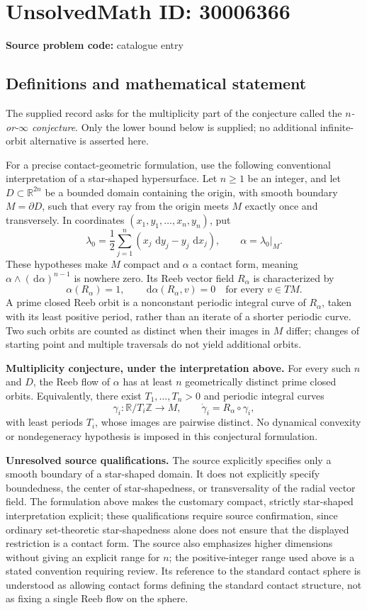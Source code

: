 \documentclass[11pt]{article}
\newcommand{\Z}{\mathbb{Z}}
\newcommand{\R}{\mathbb{R}}
\newcommand{\dd}{\,\mathrm{d}}
\begin{document}
\section*{UnsolvedMath ID: 30006366}
\textbf{Source problem code:} catalogue entry
\subsection{Definitions and mathematical statement}
The supplied record asks for the multiplicity part of the conjecture called the \emph{\(n\)-or-\(\infty\) conjecture}. Only the lower bound below is supplied; no additional infinite-orbit alternative is asserted here.

For a precise contact-geometric formulation, use the following conventional interpretation of a star-shaped hypersurface. Let \(n\geq 1\) be an integer, and let \(D\subset\R^{2n}\) be a bounded domain containing the origin, with smooth boundary \(M=\partial D\), such that every ray from the origin meets \(M\) exactly once and transversely. In coordinates \((x_1,y_1,\ldots,x_n,y_n)\), put
\[
\lambda_0=\frac12\sum_{j=1}^{n}(x_j\,\dd y_j-y_j\,\dd x_j),\qquad \alpha=\lambda_0|_M.
\]
These hypotheses make \(M\) compact and \(\alpha\) a contact form, meaning \(\alpha\wedge(\dd\alpha)^{n-1}\) is nowhere zero. Its Reeb vector field \(R_\alpha\) is characterized by
\[
\alpha(R_\alpha)=1,\qquad \dd\alpha(R_\alpha,v)=0\quad\text{for every }v\in TM.
\]
A prime closed Reeb orbit is a nonconstant periodic integral curve of \(R_\alpha\), taken with its least positive period, rather than an iterate of a shorter periodic curve. Two such orbits are counted as distinct when their images in \(M\) differ; changes of starting point and multiple traversals do not yield additional orbits.

\textbf{Multiplicity conjecture, under the interpretation above.} For every such \(n\) and \(D\), the Reeb flow of \(\alpha\) has at least \(n\) geometrically distinct prime closed orbits. Equivalently, there exist \(T_1,\ldots,T_n>0\) and periodic integral curves
\[
\gamma_i:\R/T_i\Z\longrightarrow M,\qquad \dot\gamma_i=R_\alpha\circ\gamma_i,
\]
with least periods \(T_i\), whose images are pairwise distinct. No dynamical convexity or nondegeneracy hypothesis is imposed in this conjectural formulation.

\textbf{Unresolved source qualifications.} The source explicitly specifies only a smooth boundary of a star-shaped domain. It does not explicitly specify boundedness, the center of star-shapedness, or transversality of the radial vector field. The formulation above makes the customary compact, strictly star-shaped interpretation explicit; these qualifications require source confirmation, since ordinary set-theoretic star-shapedness alone does not ensure that the displayed restriction is a contact form. The source also emphasizes higher dimensions without giving an explicit range for \(n\); the positive-integer range used above is a stated convention requiring review. Its reference to the standard contact sphere is understood as allowing contact forms defining the standard contact structure, not as fixing a single Reeb flow on the sphere.
\end{document}
